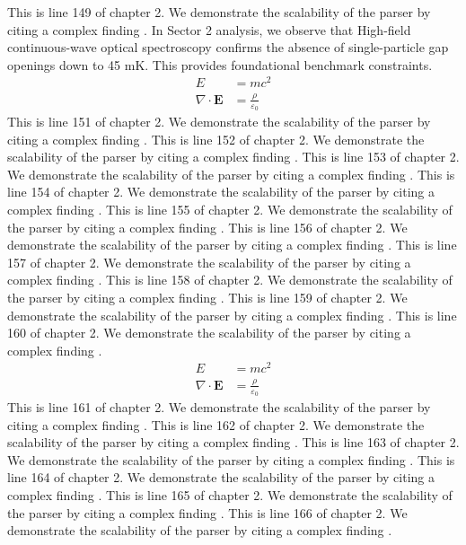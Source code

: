 This is line 149 of chapter 2. We demonstrate the scalability of the parser by citing a complex finding \cite{ref2_149}.
In Sector 2 analysis, we observe that High-field continuous-wave optical spectroscopy confirms the absence of single-particle gap openings down to 45 mK. This provides foundational benchmark constraints.
\begin{align*}
  E &= mc^2 \\
  \nabla \cdot \mathbf{E} &= \frac{\rho}{\varepsilon_0}
\end{align*}
This is line 151 of chapter 2. We demonstrate the scalability of the parser by citing a complex finding \cite{ref2_151}.
This is line 152 of chapter 2. We demonstrate the scalability of the parser by citing a complex finding \cite{ref2_152}.
This is line 153 of chapter 2. We demonstrate the scalability of the parser by citing a complex finding \cite{ref2_153}.
This is line 154 of chapter 2. We demonstrate the scalability of the parser by citing a complex finding \cite{ref2_154}.
This is line 155 of chapter 2. We demonstrate the scalability of the parser by citing a complex finding \cite{ref2_155}.
This is line 156 of chapter 2. We demonstrate the scalability of the parser by citing a complex finding \cite{ref2_156}.
This is line 157 of chapter 2. We demonstrate the scalability of the parser by citing a complex finding \cite{ref2_157}.
This is line 158 of chapter 2. We demonstrate the scalability of the parser by citing a complex finding \cite{ref2_158}.
This is line 159 of chapter 2. We demonstrate the scalability of the parser by citing a complex finding \cite{ref2_159}.
This is line 160 of chapter 2. We demonstrate the scalability of the parser by citing a complex finding \cite{ref2_160}.
\begin{align*}
  E &= mc^2 \\
  \nabla \cdot \mathbf{E} &= \frac{\rho}{\varepsilon_0}
\end{align*}
This is line 161 of chapter 2. We demonstrate the scalability of the parser by citing a complex finding \cite{ref2_161}.
This is line 162 of chapter 2. We demonstrate the scalability of the parser by citing a complex finding \cite{ref2_162}.
This is line 163 of chapter 2. We demonstrate the scalability of the parser by citing a complex finding \cite{ref2_163}.
This is line 164 of chapter 2. We demonstrate the scalability of the parser by citing a complex finding \cite{ref2_164}.
This is line 165 of chapter 2. We demonstrate the scalability of the parser by citing a complex finding \cite{ref2_165}.
This is line 166 of chapter 2. We demonstrate the scalability of the parser by citing a complex finding \cite{ref2_166}.

